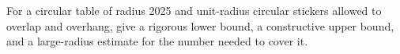 For a circular table of radius 2025 and unit-radius circular stickers allowed to overlap and overhang, give a rigorous lower bound, a constructive upper bound, and a large-radius estimate for the number needed to cover it.
